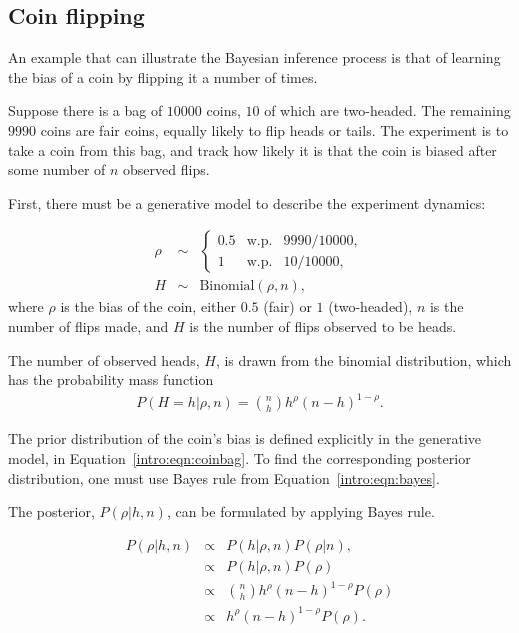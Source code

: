 \subsection{Coin flipping}
\label{sec:intro:coin-flipping}
An example that can illustrate the Bayesian inference process is that of learning the bias of a coin by flipping it a number of times.

Suppose there is a bag of $10000$ coins, $10$ of which are two-headed. The remaining $9990$ coins are fair coins, equally likely to flip heads or tails. The experiment is to take a coin from this bag, and track how likely it is that the coin is biased after some number of $n$ observed flips.

First, there must be a generative model to describe the experiment dynamics:

\begin{eqnarray}
\label{intro:eqn:coinbag}\rho &\sim&
\left\{\begin{array}{lll}
0.5 & \mbox{w.p.} & 9990/10000,\\
1 & \mbox{w.p.} & 10/10000,
\end{array}\right.\\
\label{}H &\sim& \mbox{Binomial}(\rho, n),
\end{eqnarray}
where $\rho$ is the bias of the coin, either $0.5$ (fair) or $1$ (two-headed), $n$ is the number of flips made, and $H$ is the number of flips observed to be heads.

The number of observed heads, $H$, is drawn from the binomial distribution, which has the probability mass function 
\begin{eqnarray}
\label{intro:eqn:binomial} P(H=h|\rho, n) = {n \choose h} h^\rho (n-h)^{1-\rho}.
\end{eqnarray}

The prior distribution of the coin's bias is defined explicitly in the generative model, in Equation~\ref{intro:eqn:coinbag}. To find the corresponding posterior distribution, one must use Bayes rule from Equation~\ref{intro:eqn:bayes}.

The posterior, $P(\rho|h,n)$, can be formulated by applying Bayes rule.

\begin{eqnarray}
P(\rho|h,n) & \propto & P(h|\rho,n)P(\rho|n),\\
\label{intro:eqn:coinprop} & \propto & P(h|\rho,n)P(\rho)\\
&\propto& {n \choose h} h^\rho (n-h)^{1-\rho} P(\rho)\\
&\propto& h^\rho (n-h)^{1-\rho} P(\rho).
\end{eqnarray}

